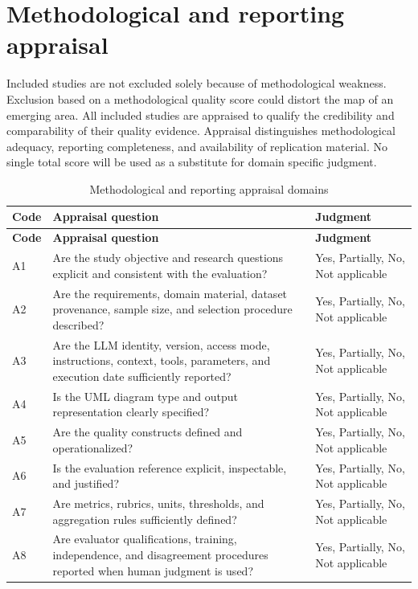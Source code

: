\section{Methodological and reporting appraisal}
\label{sec:protocol_appraisal}

Included studies are not excluded solely because of methodological weakness. Exclusion based on a methodological quality score could distort the map of an emerging area. All included studies are appraised to qualify the credibility and comparability of their quality evidence. Appraisal distinguishes methodological adequacy, reporting completeness, and availability of replication material. No single total score will be used as a substitute for domain specific judgment.

\begin{longtable}{p{} p{} p{}}
\caption{Methodological and reporting appraisal domains}
\label{tab:protocol_appraisal}\\
\toprule
\textbf{Code} & \textbf{Appraisal question} & \textbf{Judgment} \\
\midrule
\endfirsthead
\toprule
\textbf{Code} & \textbf{Appraisal question} & \textbf{Judgment} \\
\midrule
\endhead
A1 & Are the study objective and research questions explicit and consistent with the evaluation? & Yes, Partially, No, Not applicable \\
A2 & Are the requirements, domain material, dataset provenance, sample size, and selection procedure described? & Yes, Partially, No, Not applicable \\
A3 & Are the LLM identity, version, access mode, instructions, context, tools, parameters, and execution date sufficiently reported? & Yes, Partially, No, Not applicable \\
A4 & Is the UML diagram type and output representation clearly specified? & Yes, Partially, No, Not applicable \\
A5 & Are the quality constructs defined and operationalized? & Yes, Partially, No, Not applicable \\
A6 & Is the evaluation reference explicit, inspectable, and justified? & Yes, Partially, No, Not applicable \\
A7 & Are metrics, rubrics, units, thresholds, and aggregation rules sufficiently defined? & Yes, Partially, No, Not applicable \\
A8 & Are evaluator qualifications, training, independence, and disagreement procedures reported when human judgment is used? & Yes, Partially, No, Not applicable \\

\end{longtable}
